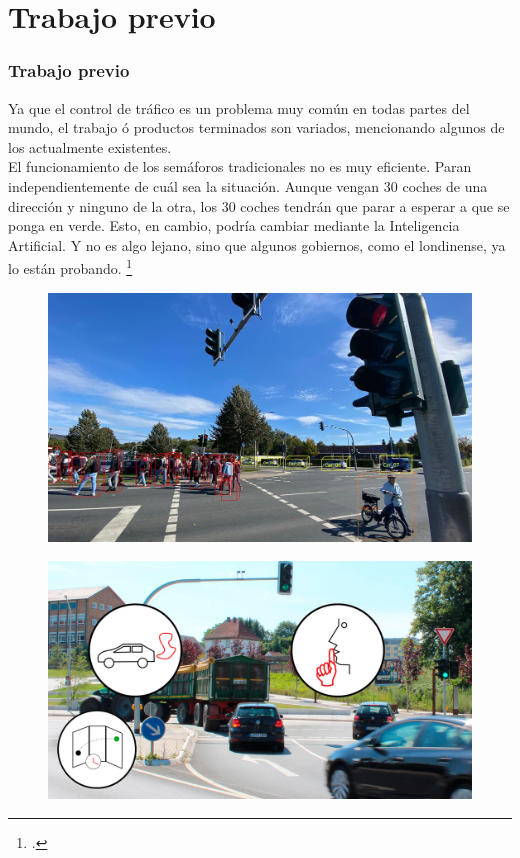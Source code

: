 \documentclass[
	11pt, %
]{beamer}
\begin{document}
\section{Trabajo previo}
\begin{frame}
  \frametitle{Trabajo previo}

  Ya que el control de tráfico es un problema muy común en todas partes del mundo, el trabajo ó productos terminados son variados, mencionando algunos de los actualmente existentes.\\
\bigskip %
  El funcionamiento de los semáforos tradicionales no es muy eficiente. Paran independientemente de cuál sea la situación. Aunque vengan 30 coches de una dirección y ninguno de la otra, los 30 coches tendrán que parar a esperar a que se ponga en verde. Esto, en cambio, podría cambiar mediante la Inteligencia Artificial. Y no es algo lejano, sino que algunos gobiernos, como el londinense, ya lo están probando. \footcite{infobae}\\
  
\end{frame}

\begin{frame}
  
  \begin{figure}
    \includegraphics[width=0.7\linewidth]{interseccion_ia.jpg}
  \end{figure}
  
    
\end{frame}

\begin{frame}
  
  \begin{figure}
    \includegraphics[width=0.8\linewidth]{sem_int.jpg}
  \end{figure}
  
    
\end{frame}
\end{document}
